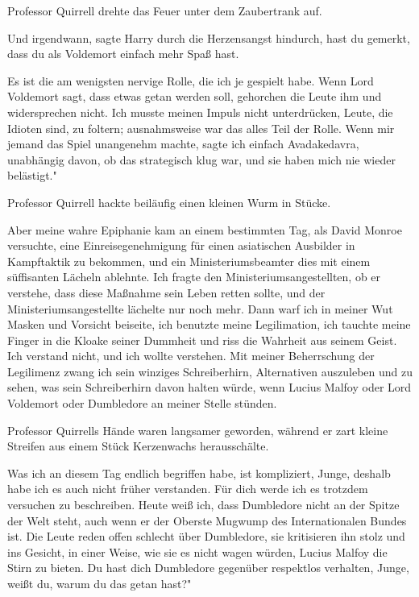 Professor Quirrell drehte das Feuer unter dem Zaubertrank auf.

\glqq Und irgendwann\grqq{}, sagte Harry durch die Herzensangst hindurch, \glqq
hast du gemerkt, dass du als Voldemort einfach mehr Spaß hast.\grqq{}

\glqq Es ist die am wenigsten nervige Rolle, die ich je gespielt habe. Wenn Lord
Voldemort sagt, dass etwas getan werden soll, gehorchen die Leute ihm und
widersprechen nicht. Ich musste meinen Impuls nicht unterdrücken, Leute, die
Idioten sind, zu foltern; ausnahmsweise war das alles Teil der Rolle. Wenn mir
jemand das Spiel unangenehm machte, sagte ich einfach Avadakedavra, unabhängig
davon, ob das strategisch klug war, und sie haben mich nie wieder belästigt."

Professor Quirrell hackte beiläufig einen kleinen Wurm in Stücke.

\glqq Aber meine wahre Epiphanie kam an einem bestimmten Tag, als David Monroe
versuchte, eine Einreisegenehmigung für einen asiatischen Ausbilder in
Kampftaktik zu bekommen, und ein Ministeriumsbeamter dies mit einem süffisanten
Lächeln ablehnte. Ich fragte den Ministeriumsangestellten, ob er verstehe, dass
diese Maßnahme sein Leben retten sollte, und der Ministeriumsangestellte
lächelte nur noch mehr. Dann warf ich in meiner Wut Masken und Vorsicht
beiseite, ich benutzte meine Legilimation, ich tauchte meine Finger in die
Kloake seiner Dummheit und riss die Wahrheit aus seinem Geist. Ich verstand
nicht, und ich wollte verstehen. Mit meiner Beherrschung der Legilimenz zwang
ich sein winziges Schreiberhirn, Alternativen auszuleben und zu sehen, was sein
Schreiberhirn davon halten würde, wenn Lucius Malfoy oder Lord Voldemort oder
Dumbledore an meiner Stelle stünden.\grqq{}

Professor Quirrells Hände waren langsamer geworden, während er zart kleine
Streifen aus einem Stück Kerzenwachs herausschälte.

\glqq Was ich an diesem Tag endlich begriffen habe, ist kompliziert, Junge,
deshalb habe ich es auch nicht früher verstanden. Für dich werde ich es trotzdem
versuchen zu beschreiben. Heute weiß ich, dass Dumbledore nicht an der Spitze
der Welt steht, auch wenn er der Oberste Mugwump des Internationalen Bundes ist.
Die Leute reden offen schlecht über Dumbledore, sie kritisieren ihn stolz und
ins Gesicht, in einer Weise, wie sie es nicht wagen würden, Lucius Malfoy die
Stirn zu bieten. Du hast dich Dumbledore gegenüber respektlos verhalten, Junge,
weißt du, warum du das getan hast?"

